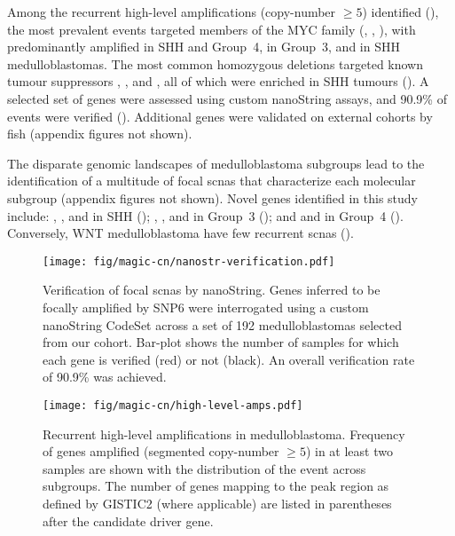 Among the recurrent high-level amplifications (copy-number $\geq 5$) identified (), the most prevalent events targeted members of the MYC family (, , ), with  predominantly amplified in SHH and Group~4,  in Group~3, and  in SHH medulloblastomas.
The most common homozygous deletions targeted known tumour suppressors , , and , all of which were enriched in SHH tumours (). A selected set of genes were assessed using custom nanoString assays, and 90.9\% of events were verified (). Additional genes were validated on external cohorts by \gls{fish} (appendix figures not shown).

The disparate genomic landscapes of medulloblastoma subgroups lead to the identification of a multitude of focal \gls{scnas} that characterize each molecular subgroup (appendix figures not shown). Novel genes identified in this study include: , , and  in SHH (); , , and  in Group~3 (); and  and  in Group~4 (). Conversely, WNT medulloblastoma have few recurrent \gls{scnas} (). 

\begin{SCfigure}[5][b]
	\centering
	\texttt{[image: fig/magic-cn/nanostr-verification.pdf]}
	\caption[Verification of focal \gls{scnas} by nanoString]
	{
	Verification of focal \gls{scnas} by nanoString.
	Genes inferred to be focally amplified by SNP6 were interrogated using a custom nanoString CodeSet across a set of 192 medulloblastomas selected from our cohort. Bar-plot shows the number of samples for which each gene is verified (red) or not (black). An overall verification rate of 90.9\% was achieved.
	}
	\label{fig:nanostr-verification}
\end{SCfigure}

\clearpage

\begin{SCfigure}[5]
	\centering
	\texttt{[image: fig/magic-cn/high-level-amps.pdf]}
	\caption[Recurrent high-level amplifications in medulloblastoma]
	{
	Recurrent high-level amplifications in medulloblastoma.
	Frequency of genes amplified (segmented copy-number $\geq 5$) in at least two samples are shown with the distribution of the event across subgroups. The number of genes mapping to the peak region as defined by GISTIC2 (where applicable) are listed in parentheses after the candidate driver gene.
	}
	\label{fig:high-level-amps}
\end{SCfigure}

